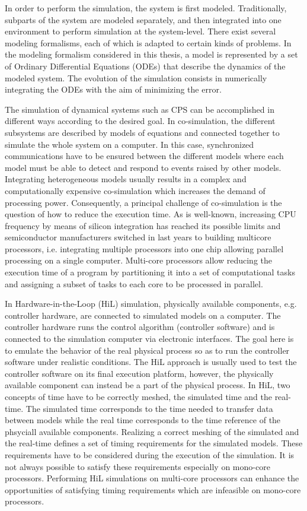 In order to perform the simulation, the system is first modeled. Traditionally, subparts of the system are modeled separately, and then integrated into one environment to perform simulation at the system-level. There exist several modeling formalisms, each of which is adapted to certain kinds of problems. In the modeling formalism considered in this thesis, a model is represented by a set of Ordinary Differential Equations (ODEs) that describe the dynamics of the modeled system. The evolution of the simulation consists in numerically integrating the ODEs with the aim of minimizing the error.

The simulation of dynamical systems such as CPS can be accomplished in different ways according to the desired goal. In co-simulation, the different subsystems are described by models of equations and connected together to simulate the whole system on a computer. In this case, synchronized communications have to be ensured between the different models where each model must be able to detect and respond to events raised by other models. Integrating heterogeneous models usually results in a complex and computationally expensive co-simulation which increases the demand of processing power. Consequently, a principal challenge of co-simulation is the question of how to reduce the execution time. As is well-known, increasing CPU frequency by means of silicon integration has reached its possible limits and semiconductor manufacturers switched in last years to building multicore processors, i.e. integrating multiple processors into one chip allowing parallel processing on a single computer. Multi-core processors allow reducing the execution time of a program by partitioning it into a set of computational tasks and assigning a subset of tasks to each core to be processed in parallel.

In Hardware-in-the-Loop (HiL) simulation, physically available components, e.g. controller hardware, are connected to simulated models on a computer. The controller hardware runs the control algorithm (controller software) and is connected to the simulation computer via electronic interfaces. The goal here is to emulate the behavior of the real physical process so as to run the controller software under realistic conditions. The HiL approach is usually used to test the controller software on its final execution platform, however, the physically available component can instead be a part of the physical process. In HiL, two concepts of time have to be correctly meshed, the simulated time and the real-time. The simulated time corresponds to the time needed to transfer data between models while the real time corresponds to the time reference of the phsyciall available components. Realizing a correct meshing of the simulated and the real-time defines a set of timing requirements for the simulated models. These requirements have to be considered during the execution of the simulation. It is not always possible to satisfy these requirements especially on mono-core processors. Performing HiL simulations on multi-core processors can enhance the opportunities of satisfying timing requirements which are infeasible on mono-core processors.

